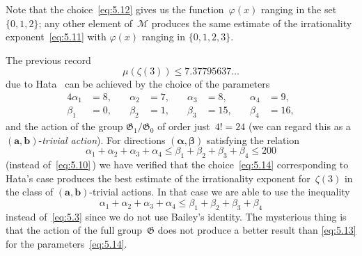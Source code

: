 \documentclass[a4paper,twoside]{article}
\numberwithin{equation}{section}
\renewcommand{\[}{\lfloor}
\renewcommand{\]}{\rfloor}
\newcommand{\<}{\langle}
\renewcommand{\>}{\rangle}
\renewcommand{\phi}{\varphi}
\newcommand{\ba}{\boldsymbol a}
\newcommand{\bb}{\boldsymbol b}
\newcommand{\balpha}{\boldsymbol\alpha}
\newcommand{\bbeta}{\boldsymbol\beta}
\newcommand{\fG}{\mathfrak G}
\newcommand{\sM}{\mathcal M}
\begin{document}
Note that the choice~\eqref{eq:5.12} gives us the function~$\phi(x)$
ranging in the set $\{0,1,2\}$; any other element of~$\sM$
produces the same estimate of the irrationality exponent~\eqref{eq:5.11}
with $\phi(x)$ ranging in $\{0,1,2,3\}$.

The previous record
\begin{equation}
\mu(\zeta(3))\le7.37795637\dots
\label{eq:5.13}
\end{equation}
due to Hata~\cite{Ha5} can be achieved by the choice of the parameters
\begin{equation}
\begin{alignedat}{4}{4}
\alpha_1&=8, \quad& \alpha_2&=7, \quad&
\alpha_3&=8, \quad& \alpha_4&=9,
\\
\beta_1&=0, \quad& \beta_2&=1, \quad&
\beta_3&=15, \quad& \beta_4&=16,
\end{alignedat}
\label{eq:5.14}
\end{equation}
and the action of the group $\fG_1/\fG_0$ of order just~$4!=24$
(we can regard this as a $(\ba,\bb)$-{\it trivial action\/}).
For directions $(\balpha,\bbeta)$ satisfying the relation
$$
\alpha_1+\alpha_2+\alpha_3+\alpha_4
\le\beta_1+\beta_2+\beta_3+\beta_4
\le200
$$
(instead of~\eqref{eq:5.10}\,) we have verified that the choice~\eqref{eq:5.14}
corresponding to Hata's case produces the best estimate of the
irrationality exponent for~$\zeta(3)$ in the class of
$(\ba,\bb)$-trivial actions.
In that case we are able to use the inequality
$$
\alpha_1+\alpha_2+\alpha_3+\alpha_4
\le\beta_1+\beta_2+\beta_3+\beta_4
$$
instead of~\eqref{eq:5.3} since we do not use Bailey's identity.
The mysterious thing is that the action of the full group~$\fG$
does not produce a better result than \eqref{eq:5.13}
for the parameters~\eqref{eq:5.14}.
\end{document}
